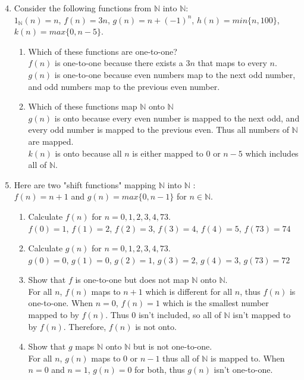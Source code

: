 \documentclass{article}
\newcommand{\N}{\mathbb{N}}
\begin{document}
\begin{enumerate}
\setcounter{enumi}{3}
\item Consider the following functions from $\N$  into $\N$:\\
$1_\N (n)=n$, $f(n) = 3n$, $g(n) = n+(-1)^n$, $h(n)=min\{n,100\}$, \\$k(n)=max\{0,n-5\}$.
	\begin{enumerate}
	\item Which of these functions are one-to-one?\\
	$f(n)$ is one-to-one because there exists a $3n$ that maps to every $n$.\\
	$g(n)$ is one-to-one because even numbers map to the next odd number, 
	and odd numbers map to the previous even number.
	\item Which of these functions map $\N$ onto $\N$\\
	$g(n)$ is onto because every even number is mapped to the next odd, 
	and every odd number is mapped to the previous even. Thus all numbers of $\N$ are mapped.\\
	$k(n)$ is onto because all $n$ is either mapped to 0 or $n-5$ which includes all of $\N$.
	\end{enumerate}
\item Here are two "shift functions" mapping $\N$ into $\N$ :\\
$f(n)=n+1$ and $g(n)=max\{0,n-1\}$ for $n \in \N$.
	\begin{enumerate}
	\item Calculate $f(n)$ for $n=0,1,2,3,4,73$.\\
	$f(0)=1$, $f(1)=2$, $f(2)=3$, $f(3)=4$, $f(4)=5$, $f(73)=74$
	\item Calculate $g(n)$ for $n=0,1,2,3,4,73$.\\
	$g(0)=0$, $g(1)=0$, $g(2)=1$, $g(3)=2$, $g(4)=3$, $g(73)=72$
	\item Show that $f$ is one-to-one but does not map $\N$ onto $\N$.\\
	For all $n$, $f(n)$ maps to $n+1$ which is different for all $n$, thus $f(n)$ is one-to-one. 
	When $n=0$, $f(n)=1$ which is the smallest number mapped to by $f(n)$. Thus $0$ isn't included, 
	so all of $\N$ isn't mapped to by $f(n)$. Therefore, $f(n)$ is not onto.
	\item Show that $g$ maps $\N$ onto $\N$ but is not one-to-one.\\
	For all $n$, $g(n)$ maps to $0$ or $n-1$ thus all of $\N$ is mapped to. When $n=0$ and $n=1$, 
	$g(n)=0$ for both, thus $g(n)$ isn't one-to-one.

\end{enumerate}
\end{enumerate}
\end{document}
